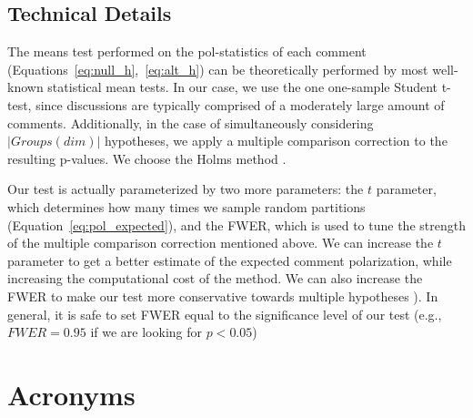 \documentclass{article}
\newcommand{\sdbdim}{\textit{dim}}
\newcommand{\Sdbgroup}{\textit{Groups}}
\begin{document}
\subsection{Technical Details}
\label{ssec:methodology:details}

The means test performed on the pol-statistics of each comment (Equations~\ref{eq:null_h},~\ref{eq:alt_h}) can be theoretically performed by most well-known statistical mean tests. In our case, we use the one one-sample Student t-test, since discussions are typically comprised of a moderately large amount of comments. Additionally, in the case of simultaneously considering $\lvert \Sdbgroup(\sdbdim) \rvert$ hypotheses, we apply a multiple comparison correction to the resulting p-values. We choose the Holms method \parencite{holms}.

Our test is actually parameterized by two more parameters: the $t$ parameter, which determines how many times we sample random partitions (Equation~\ref{eq:pol_expected}), and the \ac{FWER}, which is used to tune the strength of the multiple comparison correction mentioned above. We can increase the $t$ parameter to get a better estimate of the expected comment polarization, while increasing the computational cost of the method. We can also increase the \ac{FWER} to make our test more conservative towards multiple hypotheses \parencite{ChenFengYi2017}). In general, it is safe to set \ac{FWER} equal to the significance level of our test (e.g., $\textit{FWER} = 0.95$ if we are looking for $p < 0.05$)


\section{Acronyms}

\begin{acronym}[WWW]
\end{acronym}

\printbibliography
\end{document}
